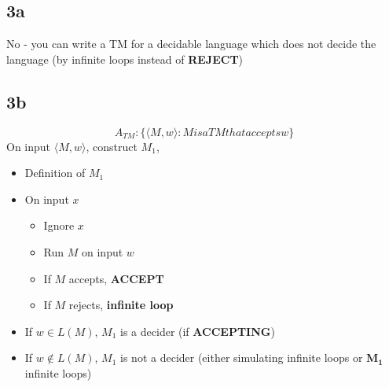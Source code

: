 \documentclass{article}
\newcommand{\mb}[1]{\mathbf{#1}}
\newcommand{\tb}[1]{\textbf{#1}}
\theoremstyle{definition}
\theoremstyle{remark}
\begin{document}
\subsection{3a}
No - you can write a TM for a decidable language which does not decide the language (by infinite loops instead of \tb{REJECT})

\subsection{3b}
\[
    A_{TM} : \{\langle M, w \rangle : M is a TM that accepts w \}
\]
On input $\langle M, w \rangle$, construct $M_1$,
\begin{itemize}
    \item Definition of $M_1$
    \item On input $x$
    \begin{itemize}
        \item Ignore $x$
        \item Run $M$ on input $w$
        \item If $M$ accepts, \tb{ACCEPT}
        \item If $M$ rejects, \tb{infinite loop}
    \end{itemize}
    \item If $w \in L(M)$, $M_1$ is a decider (if \tb{ACCEPTING})
    \item If $w \notin L(M)$, $M_1$ is not a decider (either simulating infinite loops or $\mb{M_1}$ infinite loops)
\end{itemize} 
\end{document}
